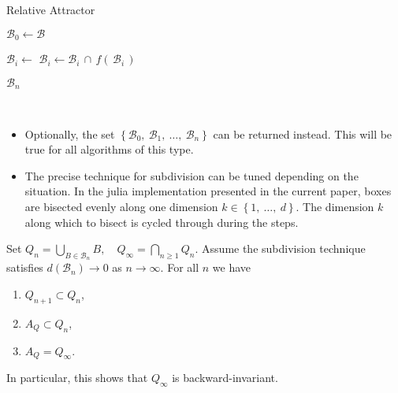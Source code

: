 \begin{algorithm}
    \caption{Relative Attractor}
    \label{alg:relativeattractor}

    \begin{algorithmic}[1]
        \State $\mathcal{B}_0 \gets \mathcal{B}$

            \State $\mathcal{B}_i \gets$ 
            \State $\mathcal{B}_i \gets \mathcal{B}_i\, \cap\, f (\,\mathcal{B}_i\,)$
        \EndFor

        \State \Return $\mathcal{B}_n$ 
    \end{algorithmic}
\end{algorithm}

\begin{remark}\
    \begin{itemize}
        \item Optionally, the set 
        $\left\{ \mathcal{B}_0,\ \mathcal{B}_1,\ \dotsc,\ \mathcal{B}_n \right\}$
        can be returned instead. This will be true for all algorithms of this type.
        \item The precise technique for subdivision can be tuned depending on the situation. 
        In the julia implementation presented in the current paper, boxes are bisected 
        evenly along one dimension $k \in \left\{1,\ \dotsc,\ d\right\}$. The dimension $k$ 
        along which to bisect is cycled through during the steps. \\
    \end{itemize}
\end{remark}

\begin{proposition}\label{thm:cover}
    \cite*{algGAIO,subalg} Set 
    $Q_n = \bigcup_{B \in \mathcal{B}_n} B,\quad Q_\infty = \bigcap_{n \geq 1} Q_n$. 
    Assume the subdivision technique satisfies $d(\mathcal{B}_n) \to 0$ as $n \to \infty$. 
    For all $n$ we have

    \begin{enumerate}
        \item $Q_{n+1} \subset Q_n$, 
        \item $A_Q \subset Q_n$, 
        \item $A_Q = Q_\infty$. 
    \end{enumerate}

    In particular, this shows that $Q_\infty$ is backward-invariant. 
\end{proposition}

